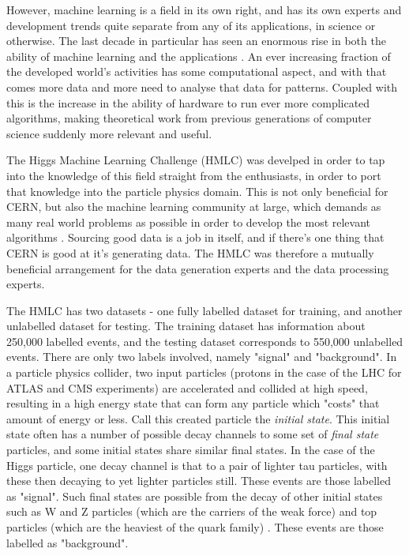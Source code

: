 \documentclass{article} %
\begin{document}
However, machine learning is a field in its own right, and has its own experts and development trends quite separate from any of its applications, in science or otherwise. The last decade in particular has seen an enormous rise in both the ability of machine learning and the applications \cite{Rousseau2015}. An ever increasing fraction of the developed world's activities has some computational aspect, and with that comes more data and more need to analyse that data for patterns. Coupled with this is the increase in the ability of hardware to run ever more complicated algorithms, making theoretical work from previous generations of computer science suddenly more relevant and useful.

The Higgs Machine Learning Challenge (HMLC) was develped in order to tap into the knowledge of this field straight from the enthusiasts, in order to port that knowledge into the particle physics domain. This is not only beneficial for CERN, but also the machine learning community at large, which demands as many real world problems as possible in order to develop the most relevant algorithms \cite{Rousseau2015}. Sourcing good data is a job in itself, and if there's one thing that CERN is good at it's generating data. The HMLC was therefore a mutually beneficial arrangement for the data generation experts and the data processing experts.

The HMLC has two datasets - one fully labelled dataset for training, and another unlabelled dataset for testing. The training dataset has information about 250,000 labelled events, and the testing dataset corresponds to 550,000 unlabelled events. There are only two labels involved, namely "signal" and "background". In a particle physics collider, two input particles (protons in the case of the LHC for ATLAS and CMS experiments) are accelerated and collided at high speed, resulting in a high energy state that can form any particle which "costs" that amount of energy or less. Call this created particle the \textit{initial state}. This initial state often has a number of possible decay channels to some set of \textit{final state} particles, and some initial states share similar final states. In the case of the Higgs particle, one decay channel is that to a pair of lighter tau particles, with these then decaying to yet lighter particles still. These events are those labelled as "signal". Such final states are possible from the decay of other initial states such as W and Z particles (which are the carriers of the weak force) and top particles (which are the heaviest of the quark family) \cite{Rousseau2015}. These events are those labelled as "background".
\end{document}
